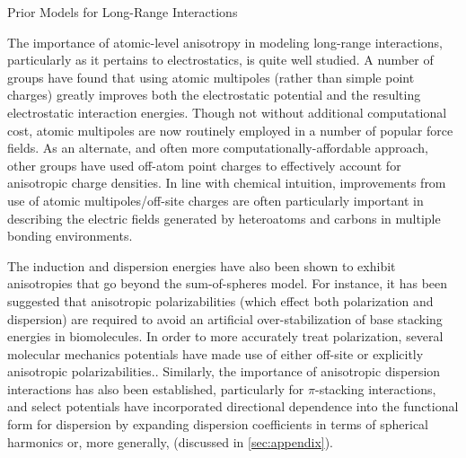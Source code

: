 %
%
%

\begin{subsection}{Prior Models for Long-Range Interactions}

The importance of atomic-level anisotropy in modeling long-range interactions,
particularly as it pertains to electrostatics, is quite well studied. A number
of groups have found that using atomic multipoles (rather than simple point
charges) greatly improves both the electrostatic potential\cite{Williams1988,Kramer2014} and 
the resulting electrostatic interaction energies.
\cite{Cardamone2014,Ren2003,Shi2013,Demerdash2014,Chaudret2014a,Giese2013,Cisneros2006,Elking2010}
Though not without additional computational cost, atomic multipoles are now
routinely employed in a number of popular force fields.
\cite{Ren2003,Shi2013,Cisneros2016a} 
As an alternate, and often more computationally-affordable approach, other groups have
used off-atom point charges to effectively account for anisotropic charge
densities.
\cite{Dixon1997,Harder2006,Rendine2011,Chaudret2013}
In line with chemical intuition, 
improvements from use of atomic multipoles/off-site charges are often particularly important in describing the
electric fields generated by heteroatoms and carbons in multiple bonding environments.
\cite{Mu2014,Wikfeldt2013}

The induction and dispersion energies have also been shown to exhibit
anisotropies that go beyond the sum-of-spheres model. For instance, it has
been suggested that anisotropic polarizabilities (which effect both polarization
and dispersion) are required to avoid an artificial over-stabilization of base
stacking energies in
biomolecules.\cite{Sponer2013} 
In order to more accurately treat polarization, several molecular mechanics potentials have
made use of either off-site\cite{Piquemal2007} or explicitly anisotropic
polarizabilities.\cite{Harder2006,Loboda2016}. 
Similarly, the importance of anisotropic dispersion interactions has also been
established,
\cite{Misquitta2008,Langhoff1971,Williams2003,Stone2007,Krishtal2011}
particularly for $\pi$-stacking interactions,\cite{Sponer2013,Zgarbova2010}
and select potentials have incorporated directional dependence into the functional
form for dispersion by expanding dispersion coefficients in terms of spherical
harmonics or, more generally,
\sfunc (discussed in \cref{sec:appendix}).\cite{Misquitta2008,Misquitta2016} 

\end{subsection}

